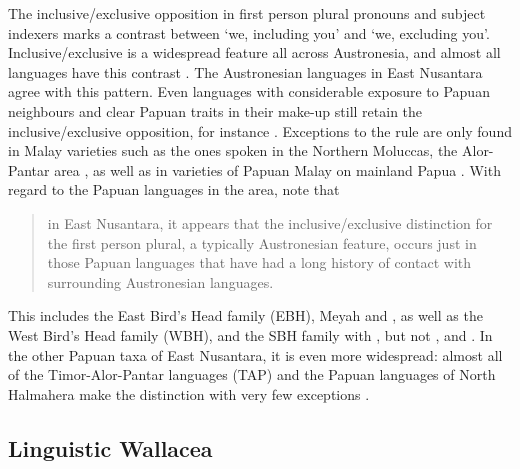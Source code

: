 The inclusive/exclusive opposition in first person plural pronouns and subject indexers marks a contrast between `we, including you' and `we, excluding you'. Inclusive/exclusive is a widespread feature all across Austronesia, and almost all languages have this contrast \citep{Tryon1995,klamer2008east}. The Austronesian languages in East Nusantara agree with this pattern. Even languages with considerable exposure to Papuan neighbours and clear Papuan traits in their make-up still retain the inclusive/exclusive opposition, for instance  \citep{klamer2011alorese}. Exceptions to the rule are only found in Malay varieties such as the ones spoken in the Northern Moluccas, the Alor-Pantar area \citep{klamer2008east}, as well as in varieties of Papuan Malay on mainland Papua \citep{kluge2014grammar}. With regard to the Papuan languages in the area, \citet[115]{klamer2008east} note that \begin{quote}in East Nusantara, it appears that the inclusive/exclusive distinction for the first person plural, a typically Austronesian feature,
occurs just in those Papuan languages that have had a long history of contact with surrounding Austronesian languages.\end{quote}
This includes the East Bird's Head family (EBH), Meyah and , as well as the West Bird's Head family (WBH), and the SBH family with , but not ,  and . In the other Papuan taxa of East Nusantara, it is even more widespread: almost all of the Timor-Alor-Pantar languages (TAP) and the Papuan languages of North Halmahera make the distinction with very few exceptions \citep[115]{klamer2008east}. 

\subsection{Linguistic Wallacea}\label{sec:wallacea}


